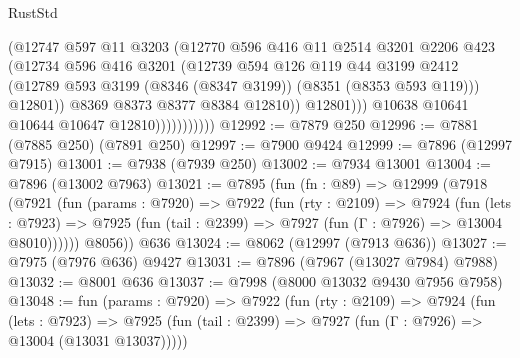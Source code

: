\begin{lexlean}{RustStd}
\begin{coremodule}
{\begin{coremodule}
{{{{{{{{{{{{{{{{{{{{{{{{{{{{{{{{{{{{{{{{{{{{{{{{{{                                (@12747
                                  @597
                                  @11
                                  @3203
                                  (@12770
                                    @596
                                    @416
                                    @11
                                    @2514
                                    @3201
                                    @2206
                                    @423
                                    (@12734
                                      @596
                                      @416
                                      @3201
                                      (@12739
                                        @594
                                        @126
                                        @119
                                        @44
                                        @3199
                                        @2412
                                        (@12789
                                          @593
                                          @3199
                                          (@8346 (@8347 @3199))
                                          (@8351 (@8353 @593 @119)))
                                        @12801))
                                    @8369
                                    @8373
                                    @8377
                                    @8384
                                    @12810))
                                @12801)))
                          @10638
                          @10641
                          @10644
                          @10647
                          @12810)))))))))))
@12992 := @7879 @250
@12996 := @7881 (@7885 @250) (@7891 @250)
@12997 := @7900 @9424
@12999 := @7896 (@12997 @7915)
@13001 := @7938 (@7939 @250)
@13002 := @7934 @13001
@13004 := @7896 (@13002 @7963)
@13021 := @7895
    (fun (fn : @89) =>
    @12999
      (@7918
        (@7921
          (fun (params : @7920) =>
          @7922
            (fun (rty : @2109) =>
            @7924
              (fun (lets : @7923) =>
              @7925 (fun (tail : @2399) => @7927 (fun (Γ : @7926) => @13004 @8010))))))
        @8056))
    @636
@13024 := @8062 (@12997 (@7913 @636))
@13027 := @7975 (@7976 @636) @9427
@13031 := @7896 (@7967 (@13027 @7984) @7988)
@13032 := @8001 @636
@13037 := @7998 (@8000 @13032 @9430 @7956 @7958)
@13048 := fun (params : @7920) =>
  @7922
    (fun (rty : @2109) =>
    @7924
      (fun (lets : @7923) =>
      @7925 (fun (tail : @2399) => @7927 (fun (Γ : @7926) => @13004 (@13031 @13037)))))
}}}}}}}}}}}}}}}}}}}}}}}}}}}}}}}}}}}}}}}}}}}}}}}}}}
\end{coremodule}}
\end{coremodule}
\end{lexlean}
